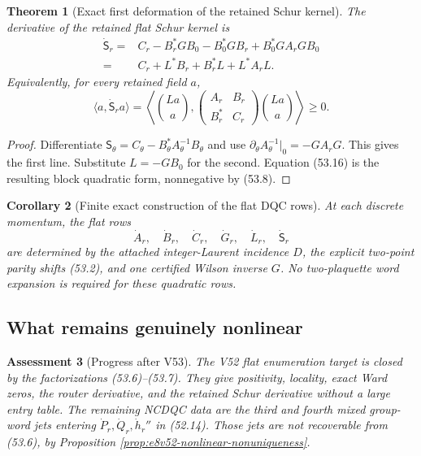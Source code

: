 \documentclass[11pt,oneside]{book}
\newtheorem{theorem}{Theorem}[chapter]
\newtheorem{corollary}[theorem]{Corollary}
\newtheorem{assessment}[theorem]{Assessment}
\theoremstyle{definition}
\theoremstyle{remark}
\begin{document}
\begin{theorem}[Exact first deformation of the retained Schur
kernel]
\label{thm:e8v53-Schur-derivative}
The derivative of the retained flat Schur kernel is
\[
\boxed{\begin{split}
 \dot{\mathsf S}_r
 ={}&C_r-B_r^*GB_0-B_0^*GB_r+B_0^*GA_rGB_0\\
 ={}&C_r+L^*B_r+B_r^*L+L^*A_rL.
\end{split}}                                                  \tag{53.15}
\]
Equivalently, for every retained field \(a\),
\[
 \langle a,\dot{\mathsf S}_ra\rangle
 =\left\langle
 \binom{La}{a},
 \begin{pmatrix}A_r&B_r\\B_r^*&C_r\end{pmatrix}
 \binom{La}{a}\right\rangle\ge0.                             \tag{53.16}
\]
\end{theorem}

\begin{proof}
Differentiate
\({\mathsf S}_\theta
=C_\theta-B_\theta^*A_\theta^{-1}B_\theta\) and use
\(\partial_\theta A_\theta^{-1}|_0=-GA_rG\).  This gives the first
line.  Substitute \(L=-GB_0\) for the second.  Equation (53.16) is
the resulting block quadratic form, nonnegative by (53.8).
\end{proof}

\begin{corollary}[Finite exact construction of the flat DQC rows]
\label{cor:e8v53-flat-DQC}
At each discrete momentum, the flat rows
\[
 \dot A_r,\quad\dot B_r,\quad\dot C_r,\quad
 \dot G_r,\quad\dot L_r,\quad\dot{\mathsf S}_r                \tag{53.17}
\]
are determined by the attached integer-Laurent incidence \(D\),
the explicit two-point parity shifts (53.2), and one certified
Wilson inverse \(G\).  No two-plaquette word expansion is required
for these quadratic rows.
\end{corollary}

\subsection{What remains genuinely nonlinear}

\begin{assessment}[Progress after V53]
\label{ass:e8v53-status}
The V52 flat enumeration target is closed by the factorizations
(53.6)--(53.7).  They give positivity, locality, exact Ward zeros,
the router derivative, and the retained Schur derivative without a
large entry table.  The remaining NCDQC data are the third and
fourth mixed group-word jets entering
\(\dot P_r,\dot Q_r,\dot h_r''\) in (52.14).  Those jets are not
recoverable from (53.6), by Proposition
\ref{prop:e8v52-nonlinear-nonuniqueness}.
\end{assessment}
\end{document}
